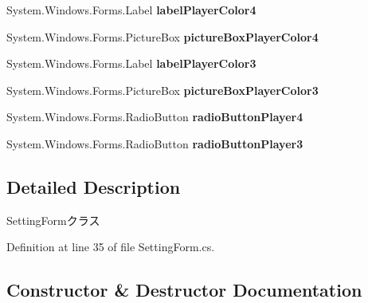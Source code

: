 \begin{DoxyCompactItemize}
\item 
\mbox{\label{class_reversi4color_form_1_1_setting_form_ab7d6161f09572923ddf667454e49814e}} 
System.\+Windows.\+Forms.\+Label {\bfseries label\+Player\+Color4}
\item 
\mbox{\label{class_reversi4color_form_1_1_setting_form_acdd3994bec8ba3cb90e06205939eb66f}} 
System.\+Windows.\+Forms.\+Picture\+Box {\bfseries picture\+Box\+Player\+Color4}
\item 
\mbox{\label{class_reversi4color_form_1_1_setting_form_a882bb1af00281a31f717209dbb3f01ac}} 
System.\+Windows.\+Forms.\+Label {\bfseries label\+Player\+Color3}
\item 
\mbox{\label{class_reversi4color_form_1_1_setting_form_aeb1fddfbb3e1e61f663c1c5775aa39bd}} 
System.\+Windows.\+Forms.\+Picture\+Box {\bfseries picture\+Box\+Player\+Color3}
\item 
\mbox{\label{class_reversi4color_form_1_1_setting_form_aa0302cdb4e6824bf17e2be8c3db1186b}} 
System.\+Windows.\+Forms.\+Radio\+Button {\bfseries radio\+Button\+Player4}
\item 
\mbox{\label{class_reversi4color_form_1_1_setting_form_ae2678249dd2dc646d1e99cb886910362}} 
System.\+Windows.\+Forms.\+Radio\+Button {\bfseries radio\+Button\+Player3}
\end{DoxyCompactItemize}


\subsection{Detailed Description}
Setting\+Formクラス 

Definition at line 35 of file Setting\+Form.\+cs.



\subsection{Constructor \& Destructor Documentation}
\mbox{\label{class_reversi4color_form_1_1_setting_form_abad707f432da3b5a135419320dbf331d}} 
